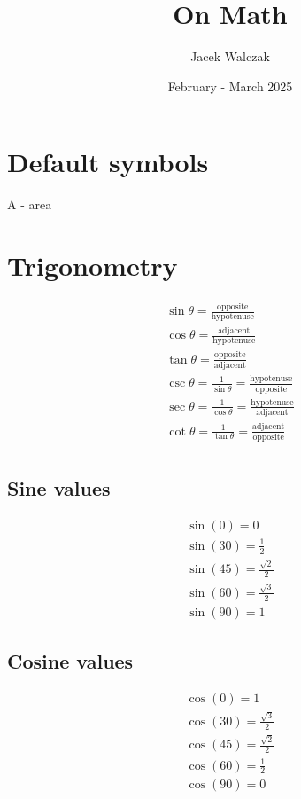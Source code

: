 \documentclass{article}
\title{On Math}
\author{Jacek Walczak}
\date{February - March 2025}
\begin{document}
\maketitle

\section{Default symbols}

A - area

\section{Trigonometry}

\begin{equation}
  \begin{gathered}
    \sin\theta = \frac{\text{opposite}}{\text{hypotenuse}} \\
    \cos\theta = \frac{\text{adjacent}}{\text{hypotenuse}} \\
    \tan\theta = \frac{\text{opposite}}{\text{adjacent}} \\
    \csc\theta = \frac{1}{\sin{\theta}} =
    \frac{\text{hypotenuse}}{\text{opposite}} \\
    \sec\theta = \frac{1}{\cos{\theta}} =
    \frac{\text{hypotenuse}}{\text{adjacent}} \\
    \cot\theta = \frac{1}{\tan{\theta}} =
    \frac{\text{adjacent}}{\text{opposite}} \\
  \end{gathered}
\end{equation}

\subsection{Sine values}
\begin{equation}
  \begin{gathered}
    \sin(0) = 0 \\
    \sin(30) = \frac{1}{2} \\
    \sin(45) = \frac{\sqrt{2}}{2} \\
    \sin(60) = \frac{\sqrt{3}}{2} \\
    \sin(90) = 1
  \end{gathered}
\end{equation}

\subsection{Cosine values}
\begin{equation}
  \begin{gathered}
    \cos(0) = 1 \\
    \cos(30) = \frac{\sqrt{3}}{2} \\
    \cos(45) = \frac{\sqrt{2}}{2} \\
    \cos(60) = \frac{1}{2} \\
    \cos(90) = 0
  \end{gathered}
\end{equation}
\end{document}
